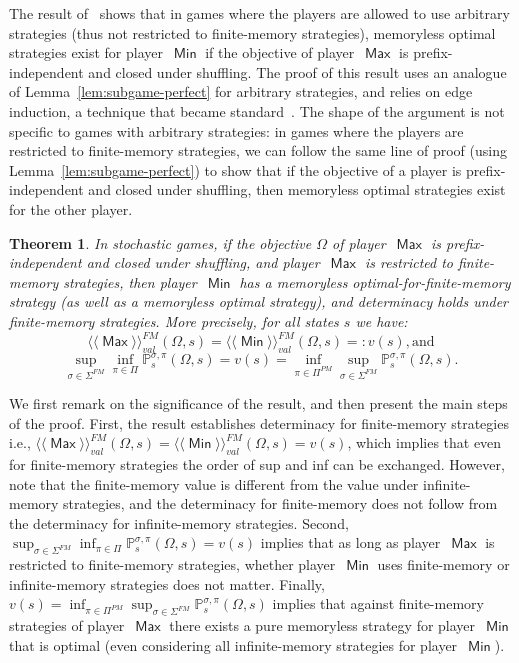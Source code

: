 \documentclass{article}
\newtheorem{theorem}{Theorem}
\newcommand{\winval}[1]{\langle \! \langle #1 \rangle\! \rangle_{\mathit{val}} }
\newcommand{\vaf}{\winval{\ma}^{{FM}}}
\newcommand{\vbf}{\winval{\mi}^{{FM}}}
\newcommand{\straa}{\sigma}
\newcommand{\Straa}{\Sigma}
\newcommand{\strab}{\pi}
\newcommand{\Strab}{\Pi}
\DeclareMathOperator{\ma}{\mathsf{Max}}
\DeclareMathOperator{\mi}{\mathsf{Min}}
\newcommand{\prob}[1]{\mathbb{P}_{#1}}
\begin{document}
The result of~\cite[Theorem~5.2]{GK14} shows that in games where the players 
are allowed to use arbitrary strategies (thus not restricted to finite-memory 
strategies), memoryless optimal strategies exist for player~$\mi$ if the objective 
of player~$\ma$ is prefix-independent and closed under shuffling. 
The proof of this result uses an analogue of Lemma~\ref{lem:subgame-perfect}
for arbitrary strategies, and relies on edge induction, a technique that
became standard~\cite{CD12,GK14,GZ05,Kop06}. 
The shape of the argument is not specific to games with arbitrary strategies:
in games where the players are restricted to finite-memory strategies, 
we can follow the same line of proof (using Lemma~\ref{lem:subgame-perfect}) 
to show that if the objective of a player is prefix-independent and 
closed under shuffling, then memoryless optimal strategies exist for the other player.


\begin{theorem}\label{theo:half-memoryless}
In stochastic games, if the objective $\Omega$ of player~$\ma$ is prefix-independent and
closed under shuffling, and player~$\ma$ is restricted to finite-memory strategies,
then player~$\mi$ has a memoryless optimal-for-finite-memory strategy (as well as a 
memoryless optimal strategy), and determinacy holds under finite-memory strategies.
More precisely, for all states $s$ we have:
$$\vaf(\Omega,s) = \vbf(\Omega,s) =: v(s), \text{and}$$
$$ \sup_{\straa \in \Straa^{FM}} \inf_{\strab \in \Strab} \prob{s}^{\straa,\strab}(\Omega,s) = v(s) = 
\inf_{\strab \in \Strab^{PM}} \sup_{\straa \in \Straa^{FM}} \prob{s}^{\straa,\strab}(\Omega,s).
$$
\end{theorem}

\smallskip{}
We first remark on the significance of the result, and then present the main steps of the 
proof.
First, the result establishes determinacy for finite-memory strategies 
i.e., $\vaf(\Omega,s) = \vbf(\Omega,s)=v(s)$, which implies that even for finite-memory strategies
the order of sup and inf can be exchanged. 
However, note that the finite-memory value is different from the value under infinite-memory 
strategies, and the determinacy for finite-memory does not follow from the determinacy
for infinite-memory strategies.
Second, $\sup_{\straa \in \Straa^{FM}} \inf_{\strab \in \Strab} \prob{s}^{\straa,\strab}(\Omega,s) = v(s)$
implies that as long as player~$\ma$ is restricted to finite-memory strategies, whether 
player~$\mi$ uses finite-memory or infinite-memory strategies does not matter.
Finally, $v(s)= \inf_{\strab \in \Strab^{PM}} \sup_{\straa \in \Straa^{FM}} \prob{s}^{\straa,\strab}(\Omega,s)$
implies that against finite-memory strategies of player~$\ma$ there exists a pure memoryless
strategy for player~$\mi$ that is optimal (even considering all infinite-memory strategies 
for player~$\mi$). 
\end{document}
